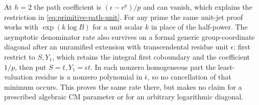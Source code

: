 At $h=2$ the path coefficient is $(\epsilon-\epsilon^p)/p$ and can vanish, which explains the restriction in \eqref{eq:primitive-path-unit}. For any prime the same unit-jet proof works with $\exp(k\log B)$ for a unit scalar $k$ in place of the half-power. The asymptotic denominator rate also survives on a formal generic group-coordinate diagonal after an unramified extension with transcendental residue unit $\epsilon$: first restrict to $S,Y_1$, which retains the integral first coboundary and the coefficient $1/p$, then put $S=t,Y_1=\epsilon t$. In each nonzero homogeneous part the least-valuation residue is a nonzero polynomial in $\bar\epsilon$, so no cancellation of that minimum occurs. This proves the same rate there, but makes no claim for a prescribed algebraic CM parameter or for an arbitrary logarithmic diagonal.

